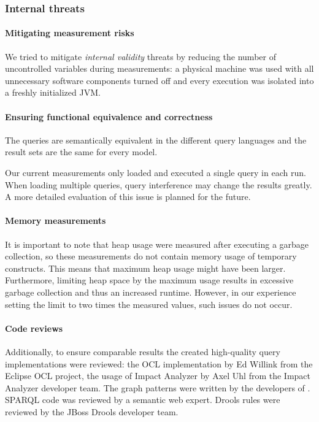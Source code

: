 \subsubsection{Internal threats}

\paragraph{Mitigating measurement risks}
We tried to mitigate \emph{internal validity} threats by reducing the number of
uncontrolled variables during measurements: a physical machine was used with all
unnecessary software components turned off and every execution was isolated into
a freshly initialized JVM.

\paragraph{Ensuring functional equivalence and correctness}
The queries are semantically equivalent in the different query languages and the
result sets are the same for every model. 

Our current measurements only loaded and executed a single query in each run.
When loading multiple queries, query interference may change the results
greatly. A more detailed evaluation of this issue is planned for the future.


\paragraph{Memory measurements}
It is important to note that heap usage were measured after executing a garbage
collection, so these measurements do not contain memory usage of temporary
constructs. This means that maximum heap usage might have been larger. Furthermore,
limiting heap space by the maximum usage results in excessive garbage collection
and thus an increased runtime. However, in our experience setting the limit to
two times the measured values, such issues do not occur.



\paragraph{Code reviews}
Additionally, to ensure comparable
results the created high-quality query implementations were reviewed: the OCL
implementation by Ed Willink from the Eclipse OCL project, the usage of Impact
Analyzer by Axel Uhl from the Impact Analyzer developer team. The graph patterns
were written by the developers of \eiq{}. SPARQL code was reviewed by a semantic web expert. Drools rules were reviewed by the JBoss Drools developer team. 

